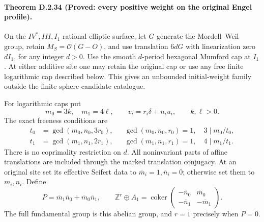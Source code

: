 \paragraph{Theorem D.2.34 (Proved: every positive weight on the original Engel profile).}
On the $IV^*,III,I_1$ rational elliptic surface, let $G$
generate the Mordell--Weil group, retain
$M_S=\mathcal O(G-O)$, and use translation $6dG$ with
linearization zero $dI_1$, for any integer $d>0$.
Use the smooth $d$-period hexagonal Mumford cap at $I_1$.
At either additive site one may retain the original cap
or use any free finite logarithmic cap described below.
This gives an unbounded initial-weight family outside
the finite sphere-candidate catalogue.

For logarithmic caps put
\[
 m_0=3k,\quad m_1=4\ell,\qquad
 v_i=r_i\delta+n_i u_i,\qquad k,\ell>0.
\]
The exact freeness conditions are
\[
\begin{aligned}
 t_0&=\gcd(m_0,n_0,3r_0),&
 &\gcd(m_0,n_0,r_0)=1,\quad 3\mid m_0/t_0,\\
 t_1&=\gcd(m_1,n_1,2r_1),&
 &\gcd(m_1,n_1,r_1)=1,\quad 4\mid m_1/t_1 .
\end{aligned}                                             \tag{D.WE1}
\]
There is no coprimality restriction on $d$.
All noninvariant parts of affine translations are
included through the marked translation conjugacy.
At an original site set its effective Seifert data to
$\overline m_i=1,\overline n_i=0$; otherwise set them
to $m_i,n_i$. Define
\[
 P=\overline m_1\overline n_0+
   \overline m_0\overline n_1,\qquad
 \mathbb Z^r\oplus A_1=
 \operatorname{coker}
 \begin{pmatrix}
  -\overline n_0&\overline m_0\\
  -\overline n_1&-\overline m_1
 \end{pmatrix}.                                           \tag{D.WE2}
\]
The full fundamental group is this abelian group, and
$r=1$ precisely when $P=0$.

